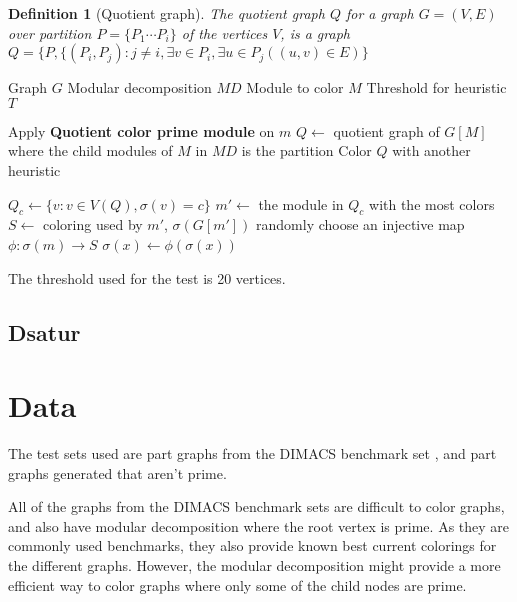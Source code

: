 \documentclass{amsart}
\newtheorem{definition}{Definition}[section]
\begin{document}
\begin{definition}[Quotient graph]
    The quotient graph $Q$ for a graph $G = (V,E)$ over partition 
    $P = \{P_1 \cdots P_i\}$  of the vertices $V$, is a graph 
    $Q = \{P, \{(P_i,P_j) : j\neq i, \exists v \in P_i,\exists u \in P_j( (u,v)
    \in E)   \}   $
\end{definition}

\begin{algorithm}[H]
  \caption{Quotient color prime module}
  \begin{algorithmic}[1]
    \REQUIRE Graph $G$
    \REQUIRE Modular decomposition $MD$
    \REQUIRE Module to color $M$
    \REQUIRE Threshold for heuristic $T$

    \ENDIF
        \STATE Apply \textbf{Quotient color prime module} on $m$
    \ENDFOR
    \STATE $Q \leftarrow $ quotient graph of $G[M]$ where the child modules of $M$ in $MD$ is the partition
    \STATE Color $Q$ with another heuristic

        \STATE $Q_c \leftarrow \{ v : v \in V(Q), \sigma(v) = c\}$
        \STATE $m' \leftarrow$ the module in $Q_c$ with the most colors
        \STATE $S \leftarrow$ coloring used by $m'$, $\sigma(G[m'])$
            \STATE randomly choose an injective map $\phi:\sigma(m)\to S$
                \STATE $\sigma(x) \leftarrow \phi(\sigma(x))$
            \ENDFOR
        \ENDFOR
    \ENDFOR

  \end{algorithmic}
\end{algorithm}

The threshold used for the test is 20 vertices.
\subsection{Dsatur}

\section{Data}
\label{sec:Data}

The test sets used are part graphs from the DIMACS benchmark set \cite{DIMACS}, 
and part graphs generated that aren't prime.

All of the graphs from the DIMACS benchmark sets are difficult to color graphs,
and also have modular decomposition where the root vertex is prime. As they are
commonly used benchmarks, they also provide known best current colorings for the
different graphs. However, the modular decomposition might provide a more
efficient way to color graphs where only some of the child nodes are prime. 
\end{document}
